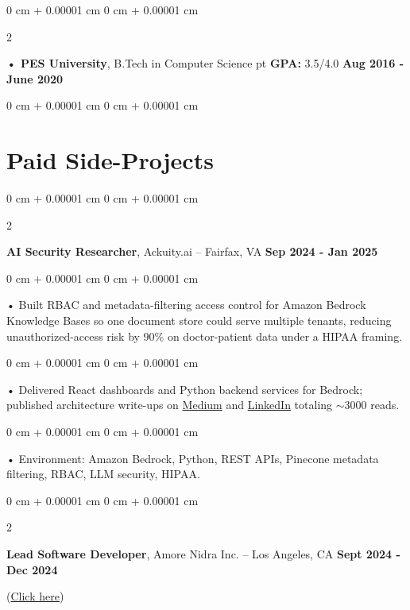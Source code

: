 \documentclass[10pt, letterpaper]{article}
\newenvironment{onecolentry}{
    \begin{adjustwidth}{
        0 cm + 0.00001 cm
    }{
        0 cm + 0.00001 cm
    }
}{
    \end{adjustwidth}
} %
\newenvironment{twocolentry}[2][]{
    \onecolentry
    \def\secondColumn{#2}
    \setcolumnwidth{\fill, 4.5 cm}
    \begin{paracol}{2}
}{
    \switchcolumn \raggedleft \secondColumn
    \end{paracol}
    \endonecolentry
} %
\begin{document}
        \begin{twocolentry}{
            \textbf{Aug 2016 - June 2020}
        }
            \textbf{ • PES University}, B.Tech in Computer Science  pt \textbf{GPA:} 3.5/4.0  \end{twocolentry}
        \begin{onecolentry}

                        \vspace{0.4cm}
    \section{Paid Side-Projects}
            \vspace{2 pt }
                    \begin{twocolentry}{
            \textbf{Sep 2024 - Jan 2025}
        }
            \textbf{AI Security Researcher}, Ackuity.ai -- Fairfax, VA\end{twocolentry}

        \begin{onecolentry}
             • Built RBAC and metadata-filtering access control for Amazon Bedrock Knowledge Bases so one document store could serve multiple tenants, reducing unauthorized-access risk by 90\% on doctor-patient data under a HIPAA framing.
        \end{onecolentry}
        \begin{onecolentry}
             • Delivered React dashboards and Python backend services for Bedrock; published architecture write-ups on \href{https://medium.com/@sreenikethaathreya/building-a-permission-aware-genai-application-on-amazon-bedrock-8fdc2410dd43}{Medium} and \href{https://www.linkedin.com/pulse/building-permission-aware-genai-application-amazon-bedrock-aathreya-g7nme/}{LinkedIn} totaling $\sim$3000 reads.
        \end{onecolentry}
        \begin{onecolentry}
             • Environment: Amazon Bedrock, Python, REST APIs, Pinecone metadata filtering, RBAC, LLM security, HIPAA.
        \end{onecolentry}
                \vspace{0.2cm}
        \begin{twocolentry}{
            \textbf{Sept 2024 - Dec 2024}
        }
            \textbf{Lead Software Developer}, Amore Nidra Inc. -- Los Angeles, CA\end{twocolentry}(\href{https://amorenidra.com}{Click here})


\end{onecolentry}
\end{document}
